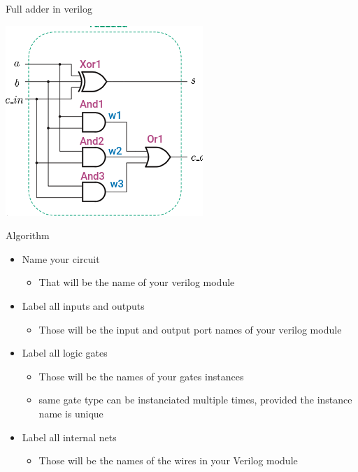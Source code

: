       
      \begin{parag}{Full adder in verilog}
          \begin{center}
              \includegraphics[scale=0.7]{52025-03-20.png}
          \end{center}
         \begin{subparag}{Algorithm}
             \begin{itemize}
                 \item Name your circuit
                     \begin{itemize}
                         \item That will be the name of your verilog module
                     \end{itemize}
                 \item Label all inputs and outputs
                     \begin{itemize}
                         \item Those will be the input and output port names of your verilog module
                             
                     \end{itemize}
                 \item Label all logic gates
                     \begin{itemize}
                         \item Those will be the names of your gates instances
                         \item same gate type can be instanciated multiple times, provided the instance name is unique
                     \end{itemize}
                 \item Label all internal nets
                     \begin{itemize}
                         \item Those will be the names of the wires in your Verilog module
                     \end{itemize}
             \end{itemize}
             

\end{subparag}
\end{parag}
